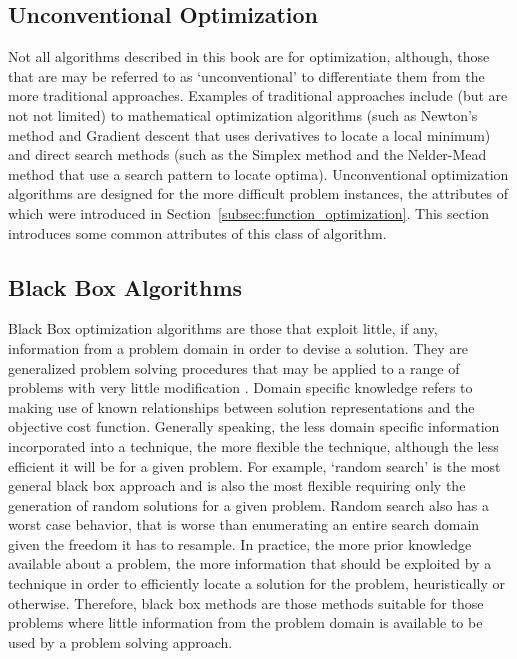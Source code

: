 \begin{bibunit}
% 
% 
\section{Unconventional Optimization}
\label{sec:unconventional_optimization}
Not all algorithms described in this book are for optimization, although, those that are may be referred to as `unconventional' to differentiate them from the more traditional approaches. Examples of traditional approaches include (but are not not limited) to mathematical optimization algorithms (such as Newton's method and Gradient descent that uses derivatives to locate a local minimum) and direct search methods (such as the Simplex method and the Nelder-Mead method that use a search pattern to locate optima).
Unconventional optimization algorithms are designed for the more difficult problem instances, the attributes of which were introduced in Section~\ref{subsec:function_optimization}. This section introduces some common attributes of this class of algorithm.

% 
% 
\subsection{Black Box Algorithms}
\label{subsec:black_box}
Black Box optimization algorithms are those that exploit little, if any, information from a problem domain in order to devise a solution. They are generalized problem solving procedures that may be applied to a range of problems with very little modification \cite{Droste2006}.
Domain specific knowledge refers to making use of known relationships between solution representations and the objective cost function. Generally speaking, the less domain specific information incorporated into a technique, the more flexible the technique, although the less efficient it will be for a given problem. For example, `random search' is the most general black box approach and is also the most flexible requiring only the generation of random solutions for a given problem. Random search also has a worst case behavior, that is worse than enumerating an entire search domain given the freedom it has to resample. In practice, the more prior knowledge available about a problem, the more information that should be exploited by a technique in order to efficiently locate a solution for the problem, heuristically or otherwise. Therefore, black box methods are those methods suitable for those problems where little information from the problem domain is available to be used by a problem solving approach.  


\end{bibunit}
